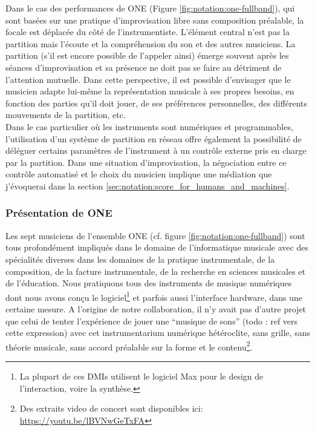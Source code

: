 \noindent Dans le cas des performances de ONE (Figure \ref{fig:notation:one-fullband}), qui sont basées sur une pratique d'improvisation libre sans composition préalable, la focale est déplacée du côté de l'instrumentiste. L'élément central n'est pas la partition mais l'écoute et la compréhension du son et des autres musiciens. La partition (s'il est encore possible de l'appeler ainsi) émerge souvent après les séances d'improvisation et sa présence ne doit pas se faire au détriment de l'attention mutuelle. Dans cette perspective, il est possible d'envisager que le musicien adapte lui-même la représentation musicale à ses propres besoins, en fonction des parties qu'il doit jouer, de ses préférences personnelles, des différents mouvements de la partition, etc.\\
\indent Dans le cas particulier où les instruments sont numériques et programmables, l'utilisation d'un système de partition en réseau offre également la possibilité de déléguer certains paramètres de l'instrument à un contrôle externe pris en charge par la partition. Dans une situation d'improvisation, la négociation entre ce contrôle automatisé et le choix du musicien implique une médiation que j'évoquerai dans la section \ref{sec:notation:score_for_humans_and_machines}.

\subsubsection{Présentation de ONE}

\noindent Les sept musiciens de l'ensemble ONE (cf. figure \ref{fig:notation:one-fullband}) sont tous profondément impliqués dans le domaine de l'informatique musicale avec des spécialités diverses dans les domaines de la pratique instrumentale, de la composition, de la facture instrumentale, de la recherche en sciences musicales et de l'éducation. Nous pratiquons tous des instruments de musique numériques dont nous avons conçu le logiciel\footnote{La plupart de ces \glspl{DMI} utilisent le logiciel Max pour le design de l'interaction, voire la synthèse.} et parfois aussi l'interface hardware, dans une certaine mesure.
A l'origine de notre collaboration, il n'y avait pas d'autre projet que celui de tenter l'expérience de jouer une ``musique de sons'' (todo : ref vers cette expression) avec cet instrumentarium numérique hétéroclite, sans grille, sans théorie musicale, sans accord préalable sur la forme et le contenu\footnote{Des extraits video de concert sont disponibles ici: \url{https://youtu.be/lBVNwGeTxFA}}.\\

